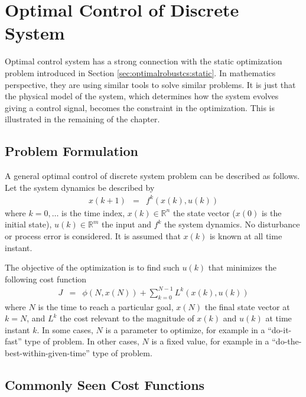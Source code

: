 \section{Optimal Control of Discrete System} \label{sec:optimalrobustcs:discrete}

Optimal control system has a strong connection with the static optimization problem introduced in Section \ref{sec:optimalrobustcs:static}. In mathematics perspective, they are using similar tools to solve similar problems. It is just that the physical model of the system, which determines how the system evolves giving a control signal, becomes the constraint in the optimization. This is illustrated in the remaining of the chapter.

\subsection{Problem Formulation}

A general optimal control of discrete system problem can be described as follows. Let the system dynamics be described by
\begin{eqnarray}
  x(k+1) &=& f^k\left(x(k), u(k)\right) \label{eq:optimalrobustcs:generaldynamic}
\end{eqnarray}
where $k=0,\ldots$ is the time index, $x(k)\in\mathbb{R}^n$ the state vector ($x(0)$ is the initial state), $u(k)\in\mathbb{R}^m$ the input and $f^k$ the system dynamics. No disturbance or process error is considered. It is assumed that $x(k)$ is known at all time instant.

The objective of the optimization is to find such $u(k)$ that minimizes the following cost function
\begin{eqnarray}
  J &=& \phi\left(N, x(N)\right) + \sum_{k=0}^{N-1}L^k\left(x(k), u(k)\right) \label{eq:optimalrobustcs:generaldiscrete}
\end{eqnarray}
where $N$ is the time to reach a particular goal, $x(N)$ the final state vector at $k=N$, and $L^k$ the cost relevant to the magnitude of $x(k)$ and $u(k)$ at time instant $k$. In some cases, $N$ is a parameter to optimize, for example in a ``do-it-fast'' type of problem. In other cases, $N$ is a fixed value, for example in a ``do-the-best-within-given-time'' type of problem.

\subsection{Commonly Seen Cost Functions}

